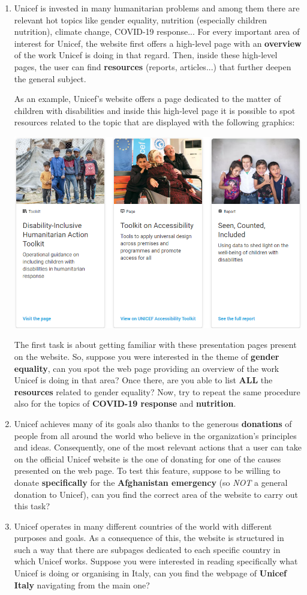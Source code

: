 \documentclass[11pt]{article}
\begin{document}
\begin{Form}
\begin{enumerate}
		\item Unicef is invested in many humanitarian problems and among them there are relevant hot topics like gender equality, nutrition (especially children nutrition), climate change, COVID-19 response... For every important area of interest for Unicef, the website first offers a high-level page with an \textbf{overview} of the work Unicef is doing in that regard. Then, inside these high-level pages, the user can find \textbf{resources} (reports, articles...) that further deepen the general subject.\clearpage
	
		As an example, Unicef's website offers a page dedicated to the matter of children with disabilities and inside this high-level page it is possible to spot resources related to the topic that are displayed with the following graphics:
		\begin{center}
			\includegraphics[width=0.3\linewidth]{res/Resources}
		\end{center}
		
		The first task is about getting familiar with these presentation pages present on the website. So, suppose you were interested in the theme of \textbf{gender equality}, can you spot the web page providing an overview of the work Unicef is doing in that area? Once there, are you able to list \textbf{ALL} the \textbf{resources} related to gender equality?
		Now, try to repeat the same procedure also for the topics of \textbf{COVID-19 response} and \textbf{nutrition}.
		
		\item Unicef achieves many of its goals also thanks to the generous \textbf{donations} of people from all around the world who believe in the organization's principles and ideas. Consequently, one of the most relevant actions that a user can take on the official Unicef website is the one of donating for one of the causes presented on the web page. To test this feature, suppose to be willing to donate \textbf{specifically} for the \textbf{Afghanistan emergency} (so \textit{NOT} a general donation to Unicef), can you find the correct area of the website to carry out this task?
		
		\item Unicef operates in many different countries of the world with different purposes and goals. As a consequence of this, the website is structured in such a way that there are subpages dedicated to each specific country in which Unicef works. Suppose you were interested in reading specifically what Unicef is doing or organising in Italy, can you find the webpage of \textbf{Unicef Italy} navigating from the main one?
		

\end{enumerate}
\end{Form}
\end{document}
